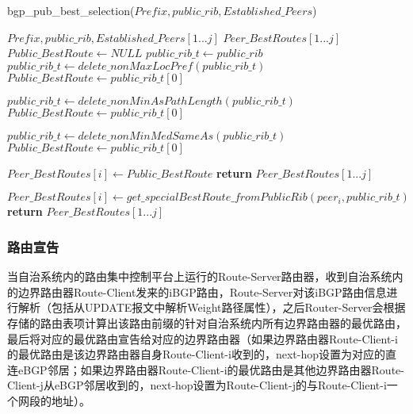 \begin{algorithm}[!h]
    \caption{bgp\_pub\_best\_selection($Prefix, public\_rib, Established\_Peers$)}
    \label{alg:public_selection_one}
    \begin{algorithmic}[1]%
        \REQUIRE
        $Prefix, public\_rib, Established\_Peers[1...j]$
        \ENSURE
        $Peer\_BestRoutes[1...j]$
        \STATE $Public\_BestRoute \gets NULL$
        \STATE $public\_rib\_t \gets public\_rib$
        \STATE $public\_rib\_t \gets delete\_nonMaxLocPref(public\_rib\_t)$
        \STATE $Public\_BestRoute  \gets public\_rib\_t[0]$
        \ENDIF

        \STATE $public\_rib\_t \gets delete\_nonMinAsPathLength(public\_rib\_t)$
        \STATE $Public\_BestRoute  \gets public\_rib\_t[0]$
        \ENDIF

        \STATE $public\_rib\_t \gets delete\_nonMinMedSameAs(public\_rib\_t)$
        \STATE $Public\_BestRoute  \gets public\_rib\_t[0]$
        \ENDIF

        \STATE $Peer\_BestRoutes[i] \gets Public\_BestRoute $
        \ENDFOR
        \STATE \textbf{return} $Peer\_BestRoutes[1...j]$
        \ENDIF

        \STATE $Peer\_BestRoutes[i] \gets get\_specialBestRoute\_fromPublicRib(peer_i,public\_rib\_t)$
        \ENDFOR
        \STATE \textbf{return} $Peer\_BestRoutes[1...j]$
    \end{algorithmic}
\end{algorithm}





\subsubsection{路由宣告}
当自治系统内的路由集中控制平台上运行的Route-Server路由器，收到自治系统内的边界路由器Route-Client发来的iBGP路由，Route-Server对该iBGP路由信息进行解析（包括从UPDATE报文中解析Weight路径属性），之后Router-Server会根据存储的路由表项计算出该路由前缀的针对自治系统内所有边界路由器的最优路由，最后将对应的最优路由宣告给对应的边界路由器（如果边界路由器Route-Client-i的最优路由是该边界路由器自身Route-Client-i收到的，next-hop设置为对应的直连eBGP邻居；如果边界路由器Route-Client-i的最优路由是其他边界路由器Route-Client-j从eBGP邻居收到的，next-hop设置为Route-Client-j的与Route-Client-i一个网段的地址）。


